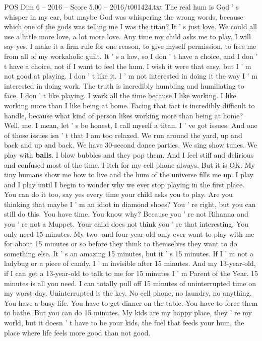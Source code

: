 \begin{textsample}{POS Dim 6 – 2016 – Score 5.00 – 2016/t001424.txt}
The real hum is God ' s whisper in my ear, but maybe God was whispering the wrong words, because which one of the gods was telling me I was the titan?
It ' s just love.
We could all use a little more love, a lot more love.
Any time my child asks me to play, I will say yes.
I make it a firm rule for one reason, to give myself permission, to free me from all of my workaholic guilt.
It ' s a law, so I don ' t have a choice, and I don ' t have a choice, not if I want to feel the hum.
I wish it were that easy, but I ' m not good at playing.
I don ' t like it.
I ' m not interested in doing it the way I ' m interested in doing work.
The truth is incredibly humbling and humiliating to face.
I don ' t like playing.
I work all the time because I like working.
I like working more than I like being at home.
Facing that fact is incredibly difficult to handle, because what kind of person likes working more than being at home?
Well, me.
I mean, let ' s be honest, I call myself a titan.
I ' ve got issues.
And one of those issues isn ' t that I am too relaxed.
We run around the yard, up and back and up and back.
We have 30-second dance parties.
We sing show tunes.
We play with \textbf{balls}.
I blow bubbles and they pop them.
And I feel stiff and delirious and confused most of the time.
I itch for my cell phone always.
But it is OK.
My tiny humans show me how to live and the hum of the universe fills me up.
I play and I play until I begin to wonder why we ever stop playing in the first place.
You can do it too, say yes every time your child asks you to play.
Are you thinking that maybe I ' m an idiot in diamond shoes?
You ' re right, but you can still do this.
You have time.
You know why?
Because you ' re not Rihanna and you ' re not a Muppet.
Your child does not think you ' re that interesting.
You only need 15 minutes.
My two- and four-year-old only ever want to play with me for about 15 minutes or so before they think to themselves they want to do something else.
It ' s an amazing 15 minutes, but it ' s 15 minutes.
If I ' m not a ladybug or a piece of candy, I ' m invisible after 15 minutes.
And my 13-year-old, if I can get a 13-year-old to talk to me for 15 minutes I ' m Parent of the Year. 15 minutes is all you need.
I can totally pull off 15 minutes of uninterrupted time on my worst day.
Uninterrupted is the key.
No cell phone, no laundry, no anything.
You have a busy life.
You have to get dinner on the table.
You have to force them to bathe.
But you can do 15 minutes.
My kids are my happy place, they ' re my world, but it doesn ' t have to be your kids, the fuel that feeds your hum, the place where life feels more good than not good.

\end{textsample}
